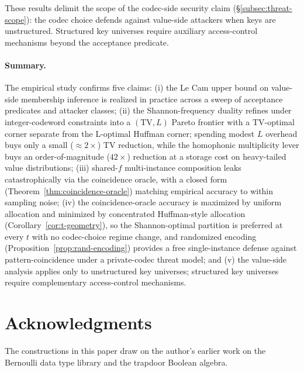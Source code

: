 \documentclass[11pt]{article}
\theoremstyle{definition}
\theoremstyle{plain}
\theoremstyle{remark}
\begin{document}
These results delimit the scope of the codec-side security claim
(\S\ref{subsec:threat-scope}): the codec choice defends against
value-side attackers when keys are unstructured.  Structured key
universes require auxiliary access-control mechanisms beyond the
acceptance predicate.

\paragraph{Summary.}
The empirical study confirms five claims:
(i) the Le Cam upper bound on value-side membership inference is
realized in practice across a sweep of acceptance predicates and
attacker classes;
(ii) the Shannon-frequency duality refines under integer-codeword
constraints into a $(\mathrm{TV}, L)$ Pareto frontier with a
TV-optimal corner separate from the L-optimal Huffman corner; spending
modest $L$ overhead buys only a small ($\approx 2\times$) TV reduction,
while the homophonic multiplicity lever buys an order-of-magnitude
($42\times$) reduction at a storage cost on heavy-tailed value
distributions;
(iii) shared-$f$ multi-instance composition leaks catastrophically
via the coincidence oracle, with a closed form
(Theorem~\ref{thm:coincidence-oracle}) matching empirical accuracy to
within sampling noise;
(iv) the coincidence-oracle accuracy is maximized by uniform
allocation and minimized by concentrated Huffman-style allocation
(Corollary~\ref{cor:t-geometry}), so the Shannon-optimal partition is
preferred at every $t$ with no codec-choice regime change, and
randomized encoding (Proposition~\ref{prop:rand-encoding}) provides a
free single-instance defense against pattern-coincidence under a
private-codec threat model; and
(v) the value-side analysis applies only to unstructured key
universes; structured key universes require complementary
access-control mechanisms.


\section*{Acknowledgments}

The constructions in this paper draw on the author's earlier work on the
Bernoulli data type library and the trapdoor Boolean algebra.



\end{document}
